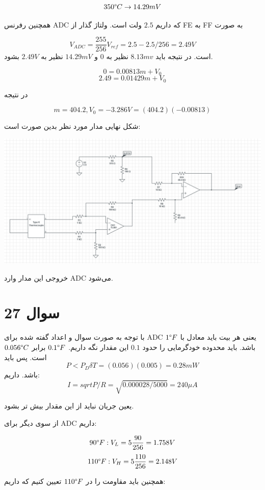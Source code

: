\documentclass[12pt]{article}
\begin{document}
$$350 \degree C \rightarrow 14.29 mV$$

همچنین رفرنس ADC که داریم $2.5$ ولت است. ولتاژ گذار از FE به FF به صورت

$$V_{ADC} =\frac{255}{256} V_{ref} = 2.5 - 2.5/256 = 2.49 V$$
است. در نتیجه باید $8.13mv$ نظیر به $0$ و $14.29mV$ نظیر به $2.49V$ بشود.


$$0 = 0.00813 m + V_0$$
$$2.49 = 0.01429 m + V_0$$

در نتیجه

$$m = 404.2 , V_0 = -3.286V = (404.2)(-0.00813)$$


شکل نهایی مدار مورد نظر بدین صورت است:


\begin{center}
	\includegraphics[width = 1.0 \textwidth]{images/6.png}
\end{center}



خروجی این مدار وارد ADC می‌شود.

\newpage
\section*{سوال 27}

با توجه به صورت سوال و اعداد گفته شده برای ADC یعنی هر بیت باید معادل با $1\degree F$ باشد. باید محدوده خودگرمایی را حدود $0.1$ این مقدار نگه داریم. $0.1\degree F$ برابر $0.056 \degree C$ است. پس باید
$$P<P_D \delta T = (0.056)(0.005) = 0.28 mW$$
باشد. داریم:
$$I = sqrt{P/R} =\sqrt{0.000028/5000} = 240 \mu A$$

یعین جریان نباید از این مقدار بیش تر بشود.


از سوی دیگر برای ADC داریم:

$$90 \degree F: V_L = 5 \frac{90}{256} = 1.758V $$
$$110 \degree F: V_H = 5 \frac{110}{256} = 2.148 V$$

همچنین باید مقاومت را در $110\degree F$ تعیین کنیم که داریم:
\end{document}
